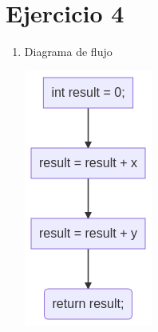 \documentclass{article}
\begin{document}
\section*{Ejercicio 4}

\begin{enumerate}
    \item Diagrama de flujo
    
        \includegraphics[scale=0.65]{recursos/restar.png}


\end{enumerate}
\end{document}

